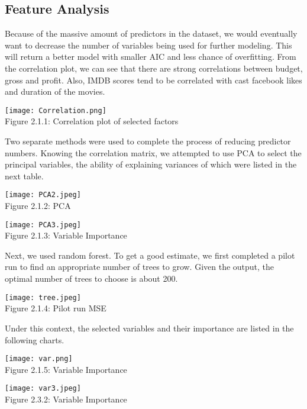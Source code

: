 \documentclass[12pt]{article}
\begin{document}
\begin{multicols}{2}
\subsection{Feature Analysis}
\bigskip
Because of the massive amount of predictors in the dataset, we would eventually want to decrease the number of variables being used for further modeling. This will return a better model with smaller AIC and less chance of overfitting. From the correlation plot, we can see that there are strong correlations between budget, gross and profit. Also, IMDB scores tend to be correlated with cast facebook likes and duration of the movies. \par
\begin{center}
\texttt{[image: Correlation.png]}\\
\footnotesize Figure 2.1.1: Correlation plot of selected factors 
\end{center}
\par
Two separate methods were used to complete the process of reducing predictor numbers. Knowing the correlation matrix, we attempted to use PCA to select the principal variables, the ability of explaining variances of which were listed in the next table. \par
\begin{center}
\texttt{[image: PCA2.jpeg]}\\
\footnotesize Figure 2.1.2: PCA
\end{center}
\begin{center}
\texttt{[image: PCA3.jpeg]}\\
\footnotesize Figure 2.1.3: Variable Importance
\end{center}
\par
Next, we used random forest. To get a good estimate, we first completed a pilot run to find an appropriate number of trees to grow. Given the output, the optimal number of trees to choose is about 200. \par
\begin{center}
\texttt{[image: tree.jpeg]}\\
\footnotesize Figure 2.1.4: Pilot run MSE
\end{center}
\par
Under this context, the selected variables and their importance are listed in the following charts. \par
\begin{center}
\texttt{[image: var.png]}\\
\footnotesize Figure 2.1.5: Variable Importance
\end{center}
\begin{center}
\texttt{[image: var3.jpeg]}\\
\footnotesize Figure 2.3.2: Variable Importance
\end{center}

\end{multicols}
\end{document}
